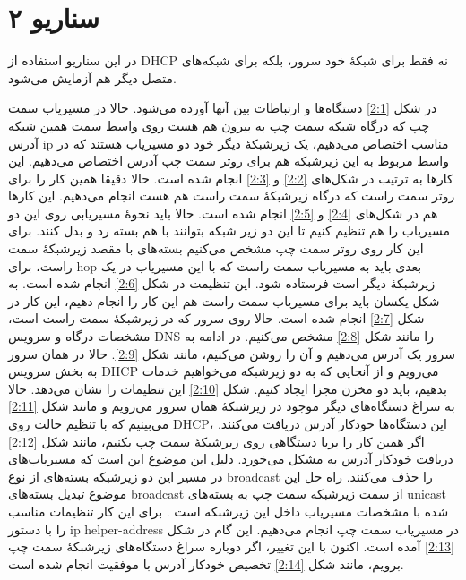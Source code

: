 \documentclass[12pt]{article}
\begin{document}
	\section{سناریو ۲}
	در این سناریو استفاده از \textenglish{DHCP} نه فقط برای شبکهٔ خود سرور، بلکه برای شبکه‌های متصل دیگر هم آزمایش می‌شود.
	
	در شکل \ref{2:1} دستگاه‌‌ها و ارتباطات بین آنها آورده می‌شود. حالا در مسیریاب سمت چپ که درگاه شبکه سمت چپ به بیرون هم هست روی واسط سمت همین شبکه آدرس \textenglish{ip} مناسب اختصاص می‌دهیم، یک زیرشبکهٔ دیگر خود دو مسیریاب هستند که در واسط مربوط به این زیرشبکه هم برای روتر سمت چپ آدرس اختصاص می‌دهیم. این کار‌ها به ترتیب در شکل‌های \ref{2:2} و \ref{2:3} انجام شده است. حالا دقیقا همین کار را برای روتر سمت راست که درگاه زیرشبکهٔ سمت راست هم هست انجام می‌‌دهیم. این کار‌ها هم در شکل‌های \ref{2:4} و \ref{2:5} انجام شده است. حالا باید نحوهٔ مسیریابی روی این دو مسیریاب را هم تنظیم کنیم تا این دو زیر شبکه بتوانند با هم بسته رد و بدل کنند. برای این کار روی روتر سمت چپ مشخص می‌کنیم بسته‌های با مقصد زیرشبکهٔ سمت راست، برای \textenglish{hop} بعدی باید به مسیریاب سمت راست که با این مسیریاب در یک زیرشبکهٔ دیگر است فرستاده شود. این تنظیمت در شکل \ref{2:6} انجام شده است. به شکل یکسان باید برای مسیریاب سمت راست هم این کار را انجام دهیم، این کار در شکل \ref{2:7} انجام شده است. حالا روی سرور که در زیرشبکهٔ سمت راست است، مشخصات درگاه و سرویس \textenglish{DNS} را مانند شکل \ref{2:8} مشخص می‌کنیم. در ادامه به سرور یک آدرس می‌دهیم و آن را روشن می‌کنیم، مانند شکل \ref{2:9}. حالا در همان سرور به بخش سرویس \textenglish{DHCP} می‌رویم و از آنجایی که به دو زیرشبکه می‌خواهیم خدمات بدهیم، باید دو مخزن مجزا ایجاد کنیم. شکل \ref{2:10} این تنظیمات را نشان می‌دهد. حالا به سراغ دستگاه‌های دیگر موجود در زیرشبکهٔ همان سرور می‌رویم و مانند شکل \ref{2:11} می‌بینیم که با تنظیم حالت روی \textenglish{DHCP}، این دستگاه‌ها خودکار آدرس دریافت می‌کنند. اگر همین کار را بریا دستگاهی روی زیرشبکهٔ سمت چپ بکنیم، مانند شکل \ref{2:12} دریافت خودکار آدرس به مشکل می‌خورد. دلیل این موضوع این است که مسیریاب‌های در مسیر این دو زیرشبکه بسته‌های از نوع \textenglish{broadcast} را حذف می‌کنند. راه حل این موضوع تبدیل بسته‌های \textenglish{broadcast} از سمت زیرشبکه سمت چپ به بسته‌های \textenglish{unicast} شده با مشخصات مسیریاب داخل این زیرشبکه است \cite{a2}. برای این کار تنظیمات مناسب را با دستور \textenglish{ip helper-address} در مسیریاب سمت چپ انجام می‌دهیم. این گام در شکل \ref{2:13} آمده است. اکنون با این تغییر، اگر دوباره سراغ دستگاه‌های زیرشبکهٔ سمت چپ برویم، مانند شکل \ref{2:14} تخصیص خودکار آدرس با موفقیت انجام شده است.
\end{document}

